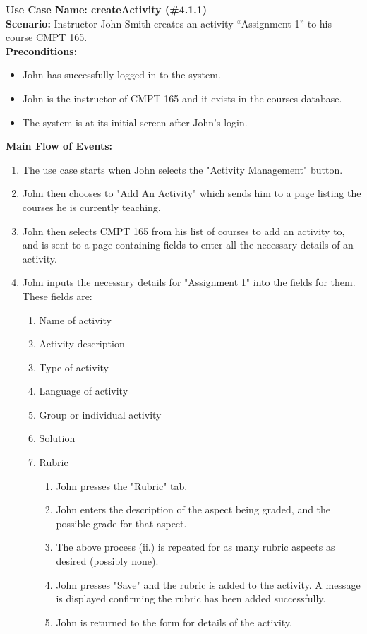 \documentclass{article}
\begin{document}
\textbf{Use Case Name: createActivity (\#4.1.1)} \\
\textbf{Scenario:} Instructor John Smith creates an activity “Assignment 1” to his
course CMPT 165.\\
\textbf{Preconditions:}
\begin{itemize}
	\item John has successfully logged in to the system.
	\item John is the instructor of CMPT 165 and it exists in the courses database.
	\item The system is at its initial screen after John's login.
\end{itemize}
\textbf{Main Flow of Events:}
\begin{enumerate}
	\item The use case starts when John selects the "Activity Management" button.
	\item John then chooses to "Add An Activity" which sends him to a page listing
		the courses he is currently teaching.
	\item John then selects CMPT 165 from his list of courses to add an activity to, and is sent to 	
		a page containing fields to enter all the necessary details of an activity.
	\item  John inputs the necessary details for "Assignment 1" into the fields for them. These
		fields are:
	\begin{enumerate}
		\item Name of activity
		\item Activity description
		\item Type of activity
		\item Language of activity
		\item Group or individual activity
		\item Solution
		\item Rubric
		\begin{enumerate}
			\item 	John presses the "Rubric" tab.
			\item John enters the description of the aspect being graded, and the 
					possible grade for that aspect.
			\item The above process (ii.) is repeated for as many rubric aspects as desired
					(possibly none).
			\item John presses "Save" and the rubric is added to the activity.
					A message is displayed confirming the rubric has been added successfully.
			\item John is returned to the form for details of the activity.

\end{enumerate}
\end{enumerate}
\end{enumerate}
\end{document}

